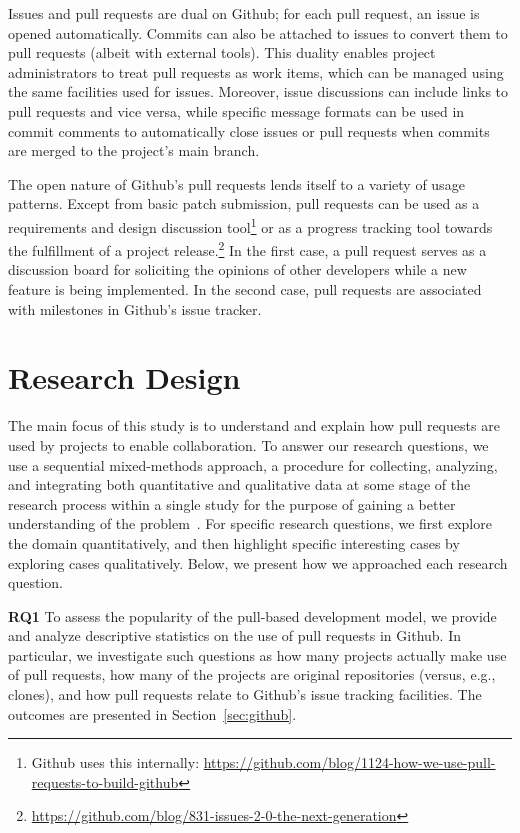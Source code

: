\documentclass{sig-alternate}
\begin{document}
Issues and pull requests are dual on Github; for each pull request, an issue is
opened automatically. Commits can also be attached to issues to convert them to
pull requests (albeit with external tools). This duality enables project administrators to treat pull requests as work items, which can be managed using the same facilities used for issues. Moreover, issue discussions can include
links to pull requests and vice versa, while specific message formats can be used
in commit comments to automatically close issues or pull requests when commits
are merged to the project's main branch.

The open nature of Github's pull requests lends itself to a variety of usage
patterns. Except from basic patch submission, pull requests can be used as a
requirements and design discussion tool\footnote{Github uses this internally:
\url{https://github.com/blog/1124-how-we-use-pull-requests-to-build-github}} or
as a progress tracking tool towards the fulfillment of a project
release.\footnote{\url{https://github.com/blog/831-issues-2-0-the-next-generation}} In
the first case, a pull request serves as a discussion board for soliciting the
opinions of other developers while a new feature is being implemented. In the
second case, pull requests are associated with milestones in Github's issue
tracker.

\section{Research Design}
\label{sec:resdesign}

The main focus of this study is to understand and explain how pull requests are
used by projects to enable collaboration. To answer our research questions, we
use a sequential mixed-methods approach, a procedure for
collecting, analyzing, and integrating both quantitative and qualitative data at
some stage of the research process within a single study for the purpose of
gaining a better understanding of the problem~\cite{Ivank06}. For specific 
research questions, we first explore the domain quantitatively,
and then highlight specific interesting cases by exploring cases qualitatively.
Below, we present how we approached each research question.

{\bfseries RQ1} To assess the popularity of the pull-based development model, we
provide and analyze descriptive statistics on the use of pull requests in Github.
In particular, we investigate such questions as how many projects actually make
use of pull requests, how many of the projects are original repositories
(versus, e.g., clones), and how pull requests relate to Github's issue tracking
facilities. The outcomes are presented in Section~\ref{sec:github}.
\end{document}
